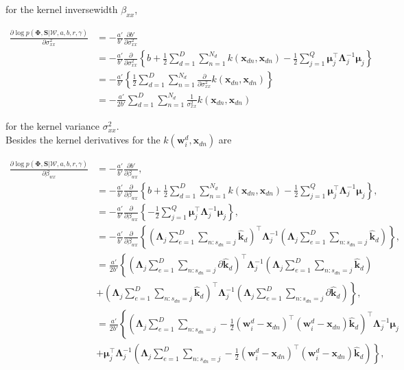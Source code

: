 \documentclass[]{article}
\newcommand{\kernel}[2]{k\left(#1,#2\right)}
\newcommand{\kernelwx}[1]{k\left(\mathbf{w}_{#1}^d,\indobj\right)}
\newcommand{\C}{\boldsymbol{\Lambda}_j}
\newcommand{\muJ}{\boldsymbol{\mu}_j}
\newcommand{\W}{\boldsymbol{\mathcal{W}}}
\newcommand{\indobj}{\mathbf{x}_{dn}}
\newcommand{\wIj}[1]{\mathbf{w}_{#1}^d}
\newcommand{\kawx}{\mathbf{\hat{k}}_d }
\newcommand{\likel}{\log p\left(\boldsymbol{\Phi},\mathbf{S}|\W,a,b,r,\gamma\right)}
\begin{document}
for the kernel inversewidth $ \beta_{xx}$,

\begin{align}
\frac{\partial \likel}{\partial \sigma^2_{xx}} &= -\frac{a'}{b'}\frac{\partial b'}{\partial \sigma^2_{xx}} \\
 & =  -\frac{a'}{b'}\frac{\partial }{\partial \sigma^2_{xx}}\left\{b+{\frac{1}{2}}\sum\limits_{d=1}^{D}\sum\limits_{n=1}^{N_d}\kernel{\indobj}{\indobj}-{\frac{1}{2}}\sum\limits_{j=1}^{Q}\boldsymbol{\mu}_j^\top \C^{-1}\muJ\right\} \\
 & = -\frac{a'}{b'}\left\{\frac{1}{2}\sum\limits_{d=1}^{D}\sum\limits_{n=1}^{N_d}\frac{\partial }{\partial \sigma^2_{xx}}\kernel{\indobj}{\indobj}\right\} \\
  & = -\frac{a'}{2b'}\sum\limits_{d=1}^{D}{\sum\limits_{n=1}^{N_d} {\frac{1}{\sigma^2_{xx}}\kernel{\indobj}{\indobj}}}
\end{align}


for the kernel variance $ \sigma^2_{xx}$.\\

Besides the kernel derivatives for the $\kernelwx{i}$ are

\begin{align}
\frac{\partial \likel}{\partial \beta_{wx}} &= -\frac{a'}{b'}\frac{\partial b'}{\partial \beta_{wx}}, \\
& =  -\frac{a'}{b'}\frac{\partial }{\partial \beta_{wx}}\left\{b+{\frac{1}{2}}\sum\limits_{d=1}^{D}\sum\limits_{n=1}^{N_d}\kernel{\indobj}{\indobj}-{\frac{1}{2}}\sum\limits_{j=1}^{Q}\boldsymbol{\mu}_j^\top \C^{-1}\muJ\right\}, \\
& =  -\frac{a'}{b'}\frac{\partial }{\partial \beta_{wx}}\left\{-{\frac{1}{2}}\sum\limits_{j=1}^{Q}\boldsymbol{\mu}_j^\top \C^{-1}\muJ\right\}, \\
& = -\frac{a'}{b'}\frac{\partial }{\partial \beta_{wx}} \left\{\left(\C\sum\limits_{e=1}^{D}{\sum\limits_{n:s_{dn}=j}\kawx}\right)^\top\C^{-1}\left(\C\sum\limits_{e=1}^{D}{\sum\limits_{n:s_{dn}=j}\kawx}\right) 
\right\},\\
& =  \frac{a'}{2b'} \left\{\left(\C\sum\limits_{e=1}^{D}{\sum\limits_{n:s_{dn}=j}\partial\kawx}\right)^\top\C^{-1}\left(\C\sum\limits_{e=1}^{D}{\sum\limits_{n:s_{dn}=j}\kawx}\right) \right. \\
&\left. +   \left(\C\sum\limits_{e=1}^{D}{\sum\limits_{n:s_{dn}=j}\kawx}\right)^\top\C^{-1}\left(\C\sum\limits_{e=1}^{D}{\sum\limits_{n:s_{dn}=j}\partial\kawx}\right)
\right\}, \\
& =  \frac{a'}{2b'} \left\{\left(\C\sum\limits_{e=1}^{D}{\sum\limits_{n:s_{dn}=j}-\frac{1}{2}\left(\wIj{i}-\indobj\right)^\top\left(\wIj{i}-\indobj\right)\kawx}\right)^\top\C^{-1}\muJ \right. \\
&\left. +   \muJ^\top\C^{-1}\left(\C\sum\limits_{e=1}^{D}{\sum\limits_{n:s_{dn}=j}-\frac{1}{2}\left(\wIj{i}-\indobj\right)^\top\left(\wIj{i}-\indobj\right)\kawx}\right)
\right\},
\end{align}
\end{document}
